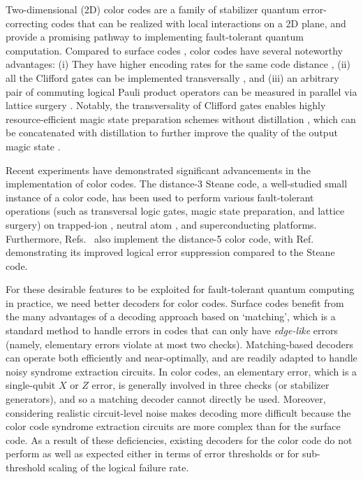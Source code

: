 \documentclass[a4paper,twocolumn,11pt,accepted=2025-01-21]{quantumarticle}
\theoremstyle{definition}
\theoremstyle{definition}
\theoremstyle{definition}
\begin{document}
Two-dimensional (2D) color codes \cite{bombin2006topological,bombin2013topological} are a family of stabilizer quantum error-correcting codes that can be realized with local interactions on a 2D plane, and provide a promising pathway to implementing fault-tolerant quantum computation.  
Compared to surface codes \cite{bravyi1998quantum,dennis2002topological}, color codes have several noteworthy advantages: (i) They have higher encoding rates for the same code distance \cite{landahl2011faulttolerant}, (ii) all the Clifford gates can be implemented transversally \cite{bombin2006topological}, and (iii) an arbitrary pair of commuting logical Pauli product operators can be measured in parallel via lattice surgery \cite{thomsen2024lowoverhead}.
Notably, the transversality of Clifford gates enables highly resource-efficient magic state preparation schemes without distillation \cite{chamberland2020very,itogawa2024even,gidney2024magic}, which can be concatenated with distillation to further improve the quality of the output magic state \cite{hirano2024leveraging,lee2024low}.

Recent experiments have demonstrated significant advancements in the implementation of color codes.
The distance-3 Steane code, a well-studied small instance of a color code, has been used to perform various fault-tolerant operations (such as transversal logic gates, magic state preparation, and lattice surgery) on trapped-ion \cite{postler2022demonstration,ryananderson2022implementing,postler2024demonstration}, neutral atom \cite{bluvstein2024logical,rodriguez2024experimental}, and superconducting \cite{lacroix2024scaling} platforms.
Furthermore, Refs.~\cite{rodriguez2024experimental,lacroix2024scaling} also implement the distance-5 color code, with Ref.~\cite{lacroix2024scaling} demonstrating its improved logical error suppression compared to the Steane code.

For these desirable features to be exploited for fault-tolerant quantum computing in practice, we need better decoders for color codes.  
Surface codes benefit from the many advantages of a decoding approach based on `matching', which is a standard method to handle errors in codes that can only have \emph{edge-like} errors (namely, elementary errors violate at most two checks).  
Matching-based decoders can operate both efficiently and near-optimally, and are readily adapted to handle noisy syndrome extraction circuits. 
In color codes, an elementary error, which is a single-qubit $X$ or $Z$ error, is generally involved in three checks (or stabilizer generators), and so a matching decoder cannot directly be used.
Moreover, considering realistic circuit-level noise makes decoding more difficult because the color code syndrome extraction circuits are more complex than for the surface code. 
As a result of these deficiencies, existing decoders for the color code do not perform as well as expected either in terms of error thresholds or for sub-threshold scaling of the logical failure rate.
\end{document}
